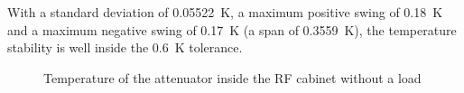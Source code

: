 With a standard deviation of \SI{0.05522}{\kelvin}, a maximum positive swing of \SI{0.18}{\kelvin} and a maximum negative swing of \SI{0.17}{\kelvin} (a span of \SI{0.3559}{\kelvin}), the temperature stability is well inside the \SI{0.6}{\kelvin} tolerance.

\begin{figure}[tb]
		\hfill
        \subfloat[Time]{}
        
        \hfill
       \caption{Temperature of the attenuator inside the RF cabinet without a load}
    \label{fig:atteneval-tempInCabinet}
\end{figure}
